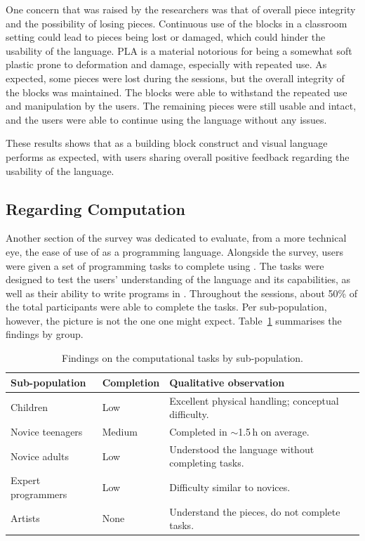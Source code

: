 One concern that was raised by the researchers was that of overall piece integrity and the possibility of losing pieces.
Continuous use of the blocks in a classroom setting could lead to pieces being lost or damaged, which could hinder the usability of the language.
PLA is a material notorious for being a somewhat soft plastic prone to deformation and damage, especially with repeated use.
As expected, some pieces were lost during the sessions, but the overall integrity of the blocks was maintained.
The blocks were able to withstand the repeated use and manipulation by the users. The remaining pieces were still usable and intact, and the users were able to continue using the language without any issues.

These results shows that \sculpt as a building block construct and visual language performs as expected, with users sharing overall positive feedback regarding the usability of the language.

\subsection{Regarding Computation}
\label{sec:results:validation:computation}

Another section of the survey was dedicated to evaluate, from a more technical eye, the ease of use of \sculpt as a programming language.
Alongside the survey, users were given a set of programming tasks to complete using \sculpt.
The tasks were designed to test the users' understanding of the language and its capabilities, as well as their ability to write programs in \sculpt.
Throughout the sessions, about 50\% of the total participants were able to complete the tasks.
Per sub-population, however, the picture is not the one one might expect.
Table~\ref{tab:validation} summarises the findings by group.

\begin{table}[h]
\centering
\small
\caption{Findings on the computational tasks by sub-population.}
\label{tab:validation}
\begin{tabular}{@{}lll@{}}
\toprule
Sub-population & Completion & Qualitative observation \\
\midrule
Children                  & Low      & Excellent physical handling; conceptual difficulty. \\
Novice teenagers          & Medium   & Completed in $\sim$1.5\,h on average. \\
Novice adults             & Low      & Understood the language without completing tasks. \\
Expert programmers        & Low      & Difficulty similar to novices. \\
Artists                   & None     & Understand the pieces, do not complete tasks. \\
\bottomrule
\end{tabular}
\end{table}

